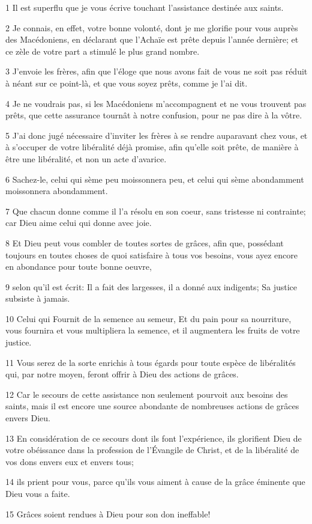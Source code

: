 \par 1 Il est superflu que je vous écrive touchant l'assistance destinée aux saints.
\par 2 Je connais, en effet, votre bonne volonté, dont je me glorifie pour vous auprès des Macédoniens, en déclarant que l'Achaïe est prête depuis l'année dernière; et ce zèle de votre part a stimulé le plus grand nombre.
\par 3 J'envoie les frères, afin que l'éloge que nous avons fait de vous ne soit pas réduit à néant sur ce point-là, et que vous soyez prêts, comme je l'ai dit.
\par 4 Je ne voudrais pas, si les Macédoniens m'accompagnent et ne vous trouvent pas prêts, que cette assurance tournât à notre confusion, pour ne pas dire à la vôtre.
\par 5 J'ai donc jugé nécessaire d'inviter les frères à se rendre auparavant chez vous, et à s'occuper de votre libéralité déjà promise, afin qu'elle soit prête, de manière à être une libéralité, et non un acte d'avarice.
\par 6 Sachez-le, celui qui sème peu moissonnera peu, et celui qui sème abondamment moissonnera abondamment.
\par 7 Que chacun donne comme il l'a résolu en son coeur, sans tristesse ni contrainte; car Dieu aime celui qui donne avec joie.
\par 8 Et Dieu peut vous combler de toutes sortes de grâces, afin que, possédant toujours en toutes choses de quoi satisfaire à tous vos besoins, vous ayez encore en abondance pour toute bonne oeuvre,
\par 9 selon qu'il est écrit: Il a fait des largesses, il a donné aux indigents; Sa justice subsiste à jamais.
\par 10 Celui qui Fournit de la semence au semeur, Et du pain pour sa nourriture, vous fournira et vous multipliera la semence, et il augmentera les fruits de votre justice.
\par 11 Vous serez de la sorte enrichis à tous égards pour toute espèce de libéralités qui, par notre moyen, feront offrir à Dieu des actions de grâces.
\par 12 Car le secours de cette assistance non seulement pourvoit aux besoins des saints, mais il est encore une source abondante de nombreuses actions de grâces envers Dieu.
\par 13 En considération de ce secours dont ils font l'expérience, ils glorifient Dieu de votre obéissance dans la profession de l'Évangile de Christ, et de la libéralité de vos dons envers eux et envers tous;
\par 14 ils prient pour vous, parce qu'ils vous aiment à cause de la grâce éminente que Dieu vous a faite.
\par 15 Grâces soient rendues à Dieu pour son don ineffable!

